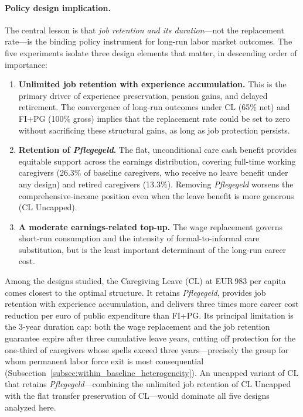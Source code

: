 \paragraph{Policy design implication.}

The central lesson is that \textit{job retention and its duration}---not the replacement rate---is the binding policy instrument for long-run labor market outcomes. The five experiments isolate three design elements that matter, in descending order of importance:
\begin{enumerate}
  \item \textbf{Unlimited job retention with experience accumulation.} This is the primary driver of experience preservation, pension gains, and delayed retirement. The convergence of long-run outcomes under CL (65\% net) and FI+PG (100\% gross) implies that the replacement rate could be set to zero without sacrificing these structural gains, as long as job protection persists.
  \item \textbf{Retention of \textit{Pflegegeld}.} The flat, unconditional care cash benefit provides equitable support across the earnings distribution, covering full-time working caregivers (26.3\% of baseline caregivers, who receive no leave benefit under any design) and retired caregivers (13.3\%). Removing \textit{Pflegegeld} worsens the comprehensive-income position even when the leave benefit is more generous (CL Uncapped).
  \item \textbf{A moderate earnings-related top-up.} The wage replacement governs short-run consumption and the intensity of formal-to-informal care substitution, but is the least important determinant of the long-run career cost.
\end{enumerate}

Among the designs studied, the Caregiving Leave (CL) at EUR\,983 per capita comes closest to the optimal structure. It retains \textit{Pflegegeld}, provides job retention with experience accumulation, and delivers three times more career cost reduction per euro of public expenditure than FI+PG. Its principal limitation is the 3-year duration cap: both the wage replacement and the job retention guarantee expire after three cumulative leave years, cutting off protection for the one-third of caregivers whose spells exceed three years---precisely the group for whom permanent labor force exit is most consequential (Subsection~\ref{subsec:within_baseline_heterogeneity}). An uncapped variant of CL that retains \textit{Pflegegeld}---combining the unlimited job retention of CL Uncapped with the flat transfer preservation of CL---would dominate all five designs analyzed here.
